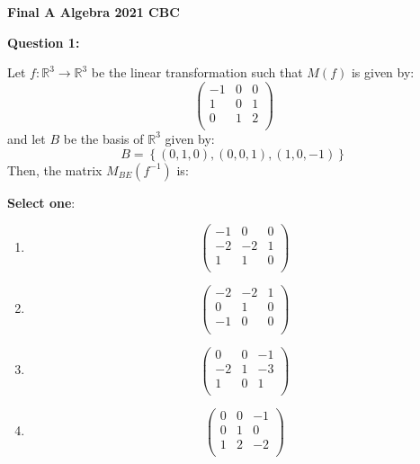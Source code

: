 \documentclass[12pt]{article}
\begin{document}
	
	\begin{center}
		\Large \textbf{Final A Algebra 2021 CBC}
	\end{center}
	
	\vspace{1cm}
	
	\noindent \textbf{Question 1:}
	
	Let \( f: \mathbb{R}^3 \to \mathbb{R}^3 \) be the linear transformation such that \( M(f) \) is given by:
	\[
	\begin{pmatrix}
		-1 & 0 & 0 \\
		1 & 0 & 1 \\
		0 & 1 & 2 \\
	\end{pmatrix}
	\]
	and let \( B \) be the basis of \( \mathbb{R}^3 \) given by:
	\[
	B = \left\{ (0,1,0), (0,0,1), (1,0,-1) \right\}
	\]
	Then, the matrix \( M_{BE}(f^{-1}) \) is:
	
	\textbf{Select one}:
	
	\begin{enumerate}[label=\arabic*.]
		\item \[
		\begin{pmatrix}
			-1 & 0 & 0 \\
			-2 & -2 & 1 \\
			1 & 1 & 0 \\
		\end{pmatrix}
		\]
		
		\item \[
		\begin{pmatrix}
			-2 & -2 & 1 \\
			0 & 1 & 0 \\
			-1 & 0 & 0 \\
		\end{pmatrix}
		\]
		
		\item \[
		\begin{pmatrix}
			0 & 0 & -1 \\
			-2 & 1 & -3 \\
			1 & 0 & 1 \\
		\end{pmatrix}
		\]
		
		\item \[
		\begin{pmatrix}
			0 & 0 & -1 \\
			0 & 1 & 0 \\
			1 & 2 & -2 \\
		\end{pmatrix}
		\]
	\end{enumerate}
	
\end{document}

